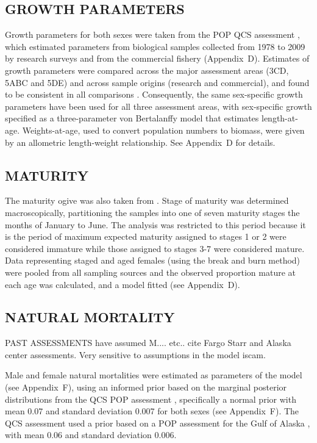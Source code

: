 \subsection{GROWTH PARAMETERS}

Growth parameters for both sexes were taken from the POP QCS assessment , which estimated parameters from biological samples collected from 1978 to 2009 by research surveys and from the commercial fishery (Appendix~D). Estimates of growth parameters were compared across the major assessment areas (3CD, 5ABC and 5DE) and across sample origins (research and commercial), and found to be consistent in all comparisons . Consequently, the same sex-specific growth parameters have been used for all three assessment areas, with sex-specific growth specified as a three-parameter von Bertalanffy model that estimates length-at-age. Weights-at-age, used to convert population numbers to biomass, were given by an allometric length-weight relationship. See Appendix~D for details. 

\subsection{MATURITY}

The maturity ogive was also taken from . Stage of maturity was determined macroscopically, partitioning the samples into one of seven maturity stages  the months of January to June. The analysis was restricted to this period because it is the period of maximum expected maturity  assigned to stages 1 or 2 were considered immature while those assigned to stages 3-7 were considered mature. Data representing staged and aged females (using the break and burn method) were pooled from all sampling sources and the observed proportion mature at each age was calculated, and a model fitted (see Appendix~D).

\subsection{NATURAL MORTALITY}

PAST ASSESSMENTS have assumed M.... etc.. cite Fargo Starr and Alaska center assessments. Very sensitive to assumptions in the model iscam.

Male and female natural mortalities were estimated as parameters of the model (see Appendix~F), using an informed prior based on the marginal posterior distributions from the QCS POP assessment , specifically a normal prior with mean 0.07 and standard deviation 0.007 for both sexes (see Appendix~F). The QCS assessment used a prior based on a POP assessment for the Gulf of Alaska , with mean 0.06 and standard deviation 0.006.


